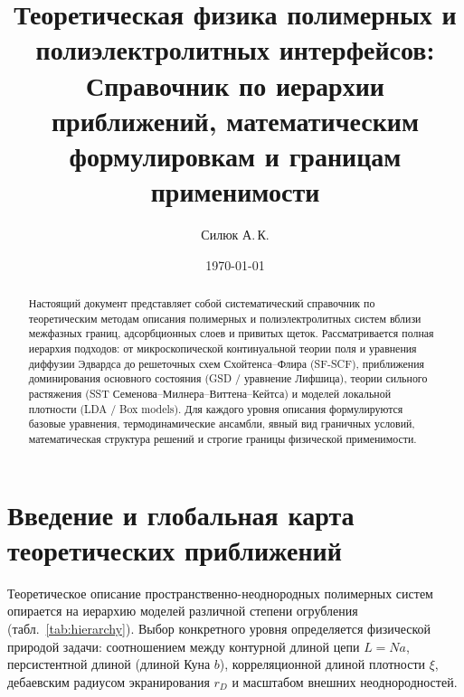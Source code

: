 \documentclass[12pt,a4paper]{article}
\title{\Large\bfseries Теоретическая физика полимерных и полиэлектролитных интерфейсов:\\
\large Справочник по иерархии приближений, математическим формулировкам и границам применимости}
\author{Силюк А.\,К.}
\date{\today}
\begin{document}
\maketitle

\begin{abstract}
Настоящий документ представляет собой систематический справочник по теоретическим методам описания полимерных и полиэлектролитных систем вблизи межфазных границ, адсорбционных слоев и привитых щеток. Рассматривается полная иерархия подходов: от микроскопической континуальной теории поля и уравнения диффузии Эдвардса до решеточных схем Схойтенса--Флира (SF-SCF), приближения доминирования основного состояния (GSD / уравнение Лифшица), теории сильного растяжения (SST Семенова--Милнера--Виттена--Кейтса) и моделей локальной плотности (LDA / Box models). Для каждого уровня описания формулируются базовые уравнения, термодинамические ансамбли, явный вид граничных условий, математическая структура решений и строгие границы физической применимости.
\end{abstract}

\tableofcontents
\newpage

\section{Введение и глобальная карта теоретических приближений}

Теоретическое описание пространственно-неоднородных полимерных систем опирается на иерархию моделей различной степени огрубления (табл.~\ref{tab:hierarchy}). Выбор конкретного уровня определяется физической природой задачи: соотношением между контурной длиной цепи $L = Na$, персистентной длиной (длиной Куна $b$), корреляционной длиной плотности $\xi$, дебаевским радиусом экранирования $r_D$ и масштабом внешних неоднородностей.
\end{document}
